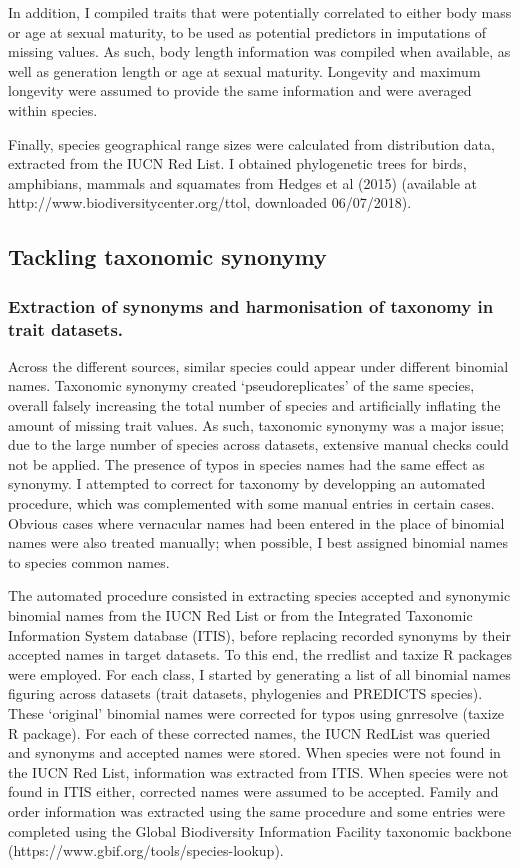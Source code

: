 In addition, I compiled traits that were potentially correlated to either body mass or age at sexual maturity, to be used as potential predictors in imputations of missing values. As such, body length information was compiled when available, as well as generation length or age at sexual maturity. Longevity and maximum longevity were assumed to provide the same information and were averaged within species.

Finally, species geographical range sizes were calculated from distribution data, extracted from the IUCN Red List. I obtained phylogenetic trees for birds, amphibians, mammals and squamates from Hedges et al (2015) (available at http://www.biodiversitycenter.org/ttol, downloaded 06/07/2018).


\subsection{Tackling taxonomic synonymy}
\subsubsection{Extraction of synonyms and harmonisation of taxonomy in trait datasets.}
Across the different sources, similar species could appear under different binomial names. Taxonomic synonymy created `pseudoreplicates' of the same species, overall falsely increasing the total number of species and artificially inflating the amount of missing trait values. As such, taxonomic synonymy was a major issue; due to the large number of species across datasets, extensive manual checks could not be applied. The presence of typos in species names had the same effect as synonymy. I attempted to correct for taxonomy by developping an automated procedure, which was complemented with some manual entries in certain cases. Obvious cases where vernacular names had been entered in the place of binomial names were also treated manually; when possible, I best assigned binomial names to species common names. 

The automated procedure consisted in extracting species accepted and synonymic binomial names from the IUCN Red List or from the Integrated Taxonomic Information System database (ITIS), before replacing recorded synonyms by their accepted names in target datasets. To this end, the rredlist and taxize R packages were employed. For each class, I started by generating a list of all binomial names figuring across datasets (trait datasets, phylogenies and PREDICTS species). These `original' binomial names were corrected for typos using gnr\textunderscore resolve (taxize R package). For each of these corrected names, the IUCN RedList was queried and synonyms and accepted names were stored. When species were not found in the IUCN Red List, information was extracted from ITIS. When species were not found in ITIS either, corrected names were assumed to be accepted. Family and order information was extracted using the same procedure and some entries were completed using the Global Biodiversity Information Facility taxonomic backbone (https://www.gbif.org/tools/species-lookup). 

